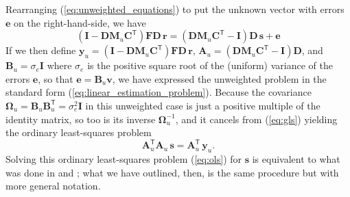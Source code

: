 \documentclass[11pt,a4paper]{article}
\renewcommand{\vec}[1]{\mathbf{#1}}
\begin{document}
Rearranging (\ref{eq:unweighted_equations}) to put the unknown vector
with errors $\vec{e}$ on the right-hand-side, we have
\begin{equation}
  \label{eq:unweighted_equations_rearranged}
  \left(\vec{I} - \vec{D}\vec{M}_u\vec{C}^\mathsf{T}\right)\vec{FD}\,\vec{r} = \left(\vec{D}\vec{M}_u\vec{C}^\mathsf{T} - \vec{I}\right)\vec{D}\,\vec{s} + \vec{e}
\end{equation}
If we then define
$\vec{y}_u = \left(\vec{I} -
  \vec{D}\vec{M}_u\vec{C}^\mathsf{T}\right)\vec{FD}\,\vec{r}$,
$\vec{A}_u = \left(\vec{D}\vec{M}_u\vec{C}^\mathsf{T} -
  \vec{I}\right)\vec{D}$, and $\vec{B}_u = \sigma_e\vec{I}$ where
$\sigma_e$ is the positive square root of the (uniform) variance of
the errors $\vec{e}$, so that $\vec{e} = \vec{B}_u\vec{v}$, we have
expressed the unweighted problem in the standard form
(\ref{eq:linear_estimation_problem}).  Because the covariance
$\bm\Omega_u = \vec{B}_u\vec{B}_u^\mathsf{T} = \sigma_e^2\vec{I}$ in
this unweighted case is just a positive multiple of the identity
matrix, so too is its inverse $\bm\Omega_u^{-1}$, and it cancels from
(\ref{eq:gls}) yielding the ordinary least-squares problem
\begin{equation}
  \label{eq:ols}
  \vec{A}_u^\mathsf{T}\vec{A}_u\,\vec{s} = \vec{A}_u^\mathsf{T}\,\vec{y}_u.
\end{equation}
Solving this ordinary least-squares problem (\ref{eq:ols}) for
$\vec{s}$ is equivalent to what was done in \citet{Cobb_et_al_2017}
and \citet{Cobb_and_Harvey_2019}; what we have outlined, then, is the
same procedure but with more general notation.
\end{document}
